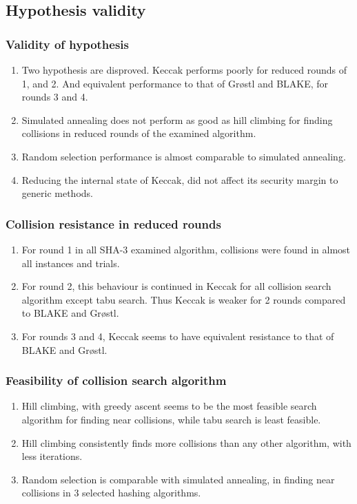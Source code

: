 \documentclass{beamer}
\begin{document}
\subsection{Hypothesis validity}

\begin{frame}
\frametitle{Validity of hypothesis}
\begin{enumerate}
\item Two hypothesis are disproved. Keccak performs poorly for reduced rounds of 1, and 2. And
equivalent performance to that of Gr{\o}stl and BLAKE, for rounds 3 and 4.
\item Simulated annealing does not perform as good as hill climbing for finding collisions in
reduced rounds of the examined algorithm.
\item Random selection performance is almost comparable to simulated annealing.
\item Reducing the internal state of Keccak, did not affect its security margin to generic methods.
\end{enumerate}
\end{frame}

\begin{frame}
\frametitle{Collision resistance in reduced rounds}
\begin{enumerate}
\item For round 1 in all SHA-3 examined algorithm, collisions were found in almost all instances and
trials.
\item For round 2, this behaviour is continued in Keccak for all collision search algorithm except tabu
search. Thus Keccak is weaker for 2 rounds compared to BLAKE and Gr{\o}stl.
\item For rounds 3 and 4, Keccak seems to have equivalent resistance to that of BLAKE and Gr{\o}stl.
\end{enumerate}
\end{frame}

\begin{frame}
\frametitle{Feasibility of collision search algorithm}
\begin{enumerate}
\item Hill climbing, with greedy ascent seems to be the most feasible search algorithm for finding near
collisions, while tabu search is least feasible.
\item Hill climbing consistently finds more collisions than any other algorithm, with less iterations.
\item Random selection is comparable with simulated annealing, in finding near collisions in 3 selected
hashing algorithms.
\end{enumerate}
\end{frame}
\end{document}
